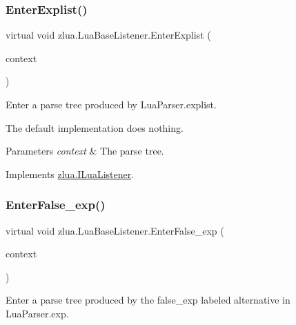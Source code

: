 \subsubsection{\texorpdfstring{Enter\+Explist()}{EnterExplist()}}
{\footnotesize\ttfamily virtual void zlua.\+Lua\+Base\+Listener.\+Enter\+Explist (\begin{DoxyParamCaption}\item[{\mbox{[}\+Not\+Null\mbox{]} \mbox{\hyperlink{classzlua_1_1_lua_parser_1_1_explist_context}{Lua\+Parser.\+Explist\+Context}}}]{context }\end{DoxyParamCaption})\hspace{0.3cm}{\ttfamily [virtual]}}



Enter a parse tree produced by Lua\+Parser.\+explist. 

The default implementation does nothing.


\begin{DoxyParams}{Parameters}
{\em context} & The parse tree.\\
\hline
\end{DoxyParams}


Implements \mbox{\hyperlink{interfacezlua_1_1_i_lua_listener_a9e310e407a85f410ec1e17d632778708}{zlua.\+I\+Lua\+Listener}}.

\mbox{\label{classzlua_1_1_lua_base_listener_a5025dfe7f75ae2d9db0e58eadba0bba0}} 
\subsubsection{\texorpdfstring{Enter\+False\+\_\+exp()}{EnterFalse\_exp()}}
{\footnotesize\ttfamily virtual void zlua.\+Lua\+Base\+Listener.\+Enter\+False\+\_\+exp (\begin{DoxyParamCaption}\item[{\mbox{[}\+Not\+Null\mbox{]} \mbox{\hyperlink{classzlua_1_1_lua_parser_1_1_false__exp_context}{Lua\+Parser.\+False\+\_\+exp\+Context}}}]{context }\end{DoxyParamCaption})\hspace{0.3cm}{\ttfamily [virtual]}}



Enter a parse tree produced by the {\ttfamily false\+\_\+exp} labeled alternative in Lua\+Parser.\+exp. 

